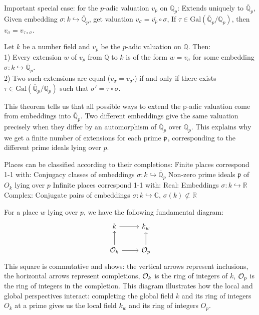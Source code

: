 \begin{outline}
    \1 Important special case: for the $p$-adic valuation $v_p$ on $\mathbb{Q}_p$:
        \2 Extends uniquely to $\overline{\mathbb{Q}}_p$,
        \2 Given embedding $\sigma:k\hookrightarrow \overline{\mathbb{Q}}_p$, get valuation $v_\sigma = \overline{v_p}\circ \sigma$,
        \2 If $\tau \in \text{Gal}(\overline{\mathbb{Q}}_p/\mathbb{Q}_p)$, then $v_\sigma = v_{\tau \circ \sigma}$.
        
\0 \begin{theorem}
    Let $k$ be a number field and $v_p$ be the $p$-adic valuation on $\mathbb{Q}$. Then:\\
    1) Every extension $w$ of $v_p$ from $\mathbb{Q}$ to $k$ is of the form $w=v_\sigma$ for some embedding $\sigma: k \hookrightarrow \overline{\mathbb{Q}}_p$.\\
    2) Two such extensions are equal ($v_\sigma = v_{\sigma'}$) if and only if there exists $\tau \in \text{Gal}(\overline{\mathbb{Q}}_p/\mathbb{Q}_p)$ such that $\sigma' = \tau \circ \sigma$.
\end{theorem}

\begin{note}
    This theorem tells us that all possible ways to extend the p-adic valuation come from embeddings into $\overline{\mathbb{Q}}_p$. Two different embeddings give the same valuation precisely when they differ by an automorphism of $\overline{\mathbb{Q}}_p$ over $\mathbb{Q}_p$. This explains why we get a finite number of extensions for each prime $\mathfrak{p}$, corresponding to the different prime ideals lying over $p$.
\end{note}

\1 Places can be classified according to their completions:
    \2 Finite places correspond 1-1 with:
        \3 Conjugacy classes of embeddings $\sigma: k\hookrightarrow \overline{\mathbb{Q}}_p$
        \3 Non-zero prime ideals $\mathfrak{p}$ of $O_k$ lying over $p$
    \2 Infinite places correspond 1-1 with:
        \3 Real: Embeddings $\sigma: k\hookrightarrow \mathbb{R}$
        \3 Complex: Conjugate pairs of embeddings $\sigma: k\hookrightarrow \mathbb{C}$, $\sigma(k)\not\subset \mathbb{R}$

\1 For a place $w$ lying over $p$, we have the following fundamental diagram:
$$\begin{tikzcd}
k \arrow[r] \arrow[d, leftarrow] & k_w \arrow[d, leftarrow] \\
\mathcal{O}_k \arrow[r] & \mathcal{O}_p
\end{tikzcd}$$
\1[] This square is commutative and shows: the vertical arrows represent inclusions, the horizontal arrows represent completions, $\mathcal{O}_k$ is the ring of integers of $k$, $\mathcal{O}_p$ is the ring of integers in the completion. This diagram illustrates how the local and global perspectives interact: completing the global field $k$ and its ring of integers $O_k$ at a prime gives us the local field $k_w$ and its ring of integers $O_p$.


\end{outline}
